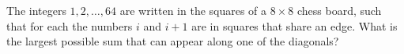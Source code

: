 The integers $1, 2, \dots, 64$ are written in the squares of a $8 \times 8$ chess board, such that for each  the numbers $i$ and $i+1$ are in squares that share an edge. What is the largest possible sum that can appear along one of the diagonals?